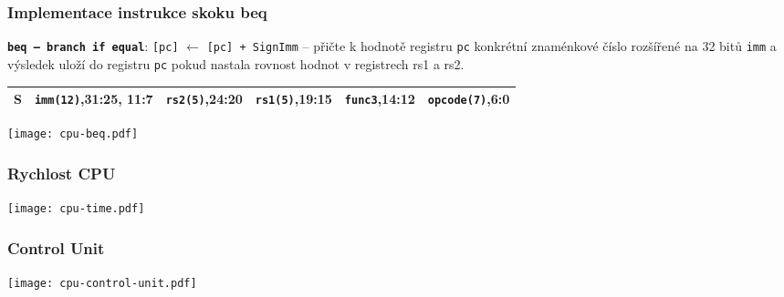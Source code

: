 \documentclass{beamer}
\begin{document}
\begin{frame}[shrink=15]
\frametitle{Implementace instrukce skoku beq}

\textbf{\texttt{beq -- branch if equal}}: \texttt{[pc]} $\leftarrow$ \texttt{[pc] + SignImm} -- přičte k hodnotě registru \texttt{pc} konkrétní znaménkové číslo rozšířené na 32 bitů \texttt{imm} a výsledek uloží do registru \texttt{pc} pokud nastala rovnost hodnot v registrech rs1 a rs2.

\bigskip

\begin{tabular}{|l|l|l|l|l|l|}\hline
S & \textbf{\texttt{imm(12)}},31:25, 11:7 & \textbf{\texttt{rs2(5)}},24:20 & \textbf{\texttt{rs1(5)}},19:15 & \textbf{\texttt{func3}},14:12 & \textbf{\texttt{opcode(7)}},6:0 \\ \hline
\end{tabular}

\bigskip

\texttt{[image: cpu-beq.pdf]}

\end{frame}


\begin{frame}
\frametitle{Rychlost CPU}

\bigskip

\texttt{[image: cpu-time.pdf]}

\end{frame}


\begin{frame}
\frametitle{Control Unit}

\bigskip

\texttt{[image: cpu-control-unit.pdf]}

\end{frame}
\end{document}
